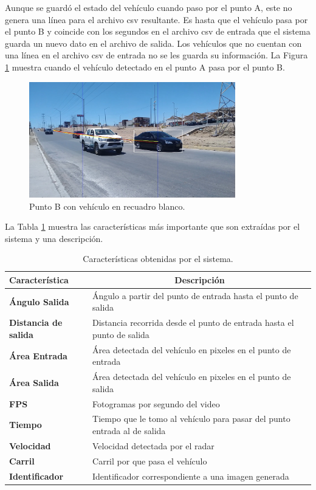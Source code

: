 Aunque se guardó el estado del vehículo cuando paso por el punto A, este no genera una línea para el archivo csv resultante. Es hasta que el vehículo pasa por el punto B y coincide con los segundos en el archivo csv de entrada que el sistema guarda un nuevo dato en el archivo de salida. Los vehículos que no cuentan con una línea en el archivo csv de entrada no se les guarda su información. La Figura \ref{fig:PuntoB} muestra cuando el vehículo detectado en el punto A pasa por el punto B.

\begin{figure}[H]
    \centering
    \includegraphics[width=0.8\textwidth]{Metodologia/imgs/Punto_B.jpg}
    \caption{Punto B con vehículo en recuadro blanco.}
    \label{fig:PuntoB}
\end{figure}

La Tabla \ref{tab:CaracteristicasSistema} muestra las características más importante que son extraídas por el sistema y una descripción.

\begin{table}[H]
    \caption{Características obtenidas por el sistema.}
    \label{tab:CaracteristicasSistema}
    \begin{tabular}{|l|l|}
        \hline
        \textbf{Característica} & \multicolumn{1}{c|}{\textbf{Descripción}} \\ \hline
        \textbf{Ángulo Salida} & Ángulo a partir del punto de entrada hasta el punto de salida \\ \hline
        \textbf{Distancia de salida} & Distancia recorrida desde el punto de entrada hasta el punto de salida \\ \hline
        \textbf{Área Entrada} & Área detectada del vehículo en pixeles en el punto de entrada \\ \hline
        \textbf{Área Salida} & Área detectada del vehículo en pixeles en el punto de salida \\ \hline
        \textbf{FPS} & Fotogramas por segundo del video \\ \hline
        \textbf{Tiempo} & Tiempo que le tomo al vehículo para pasar del punto entrada al de salida \\ \hline
        \textbf{Velocidad} & Velocidad detectada por el radar \\ \hline
        \textbf{Carril} & Carril por que pasa el vehículo \\ \hline
        \textbf{Identificador} & Identificador correspondiente a una imagen generada \\ \hline
    \end{tabular}
\end{table}


